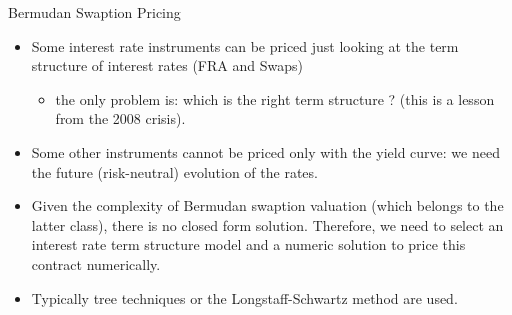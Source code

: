 \documentclass{beamer}
\begin{document}

\begin{frame}{Bermudan Swaption Pricing}
\begin{itemize}
	\item<1-> Some interest rate instruments can be priced just looking at the term structure of interest rates (FRA and Swaps)
	\begin{itemize}
		\item the only problem is: which is the right term structure ? (this is a lesson from the 2008 crisis).
	\end{itemize}
	\item<2-> Some other instruments cannot be priced only with the yield curve: we need the future (risk-neutral) evolution of the rates.
	\item<3-> Given the complexity of Bermudan swaption valuation (which belongs to the latter class), there is no closed form solution. Therefore, we need to select an interest rate term structure model and a numeric solution to price this contract numerically.		
	\item<4-> Typically tree techniques or the Longstaff-Schwartz method are used.
\end{itemize}
\end{frame}
\end{document}
